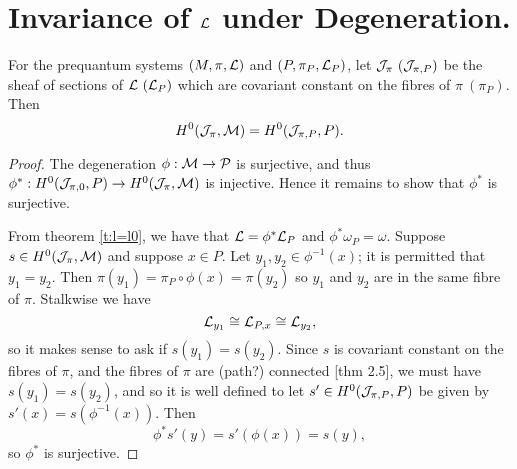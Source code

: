\section{Invariance of $\mathcal{L}$ under Degeneration.}
	\begin{theorem}
		For the prequantum systems $(M,\pi,\mathcal{L})$ and $(P,\pi_{P}, \mathcal{L}_P)$, let $\mathcal{J}_\pi ~(\mathcal{J}_{\pi,P})$ be the sheaf of sections of $\mathcal{L} ~(\mathcal{L}_P)$ which are covariant constant on the fibres of $\pi ~(\pi_P)$. Then
		\begin{equation}
			H^0(\mathcal{J}_\pi, \mathcal{M}) = H^0(\mathcal{J}_{\pi,P}, P).
		\end{equation}
	\end{theorem}
	\begin{proof}
		The degeneration $\phi:\mathcal{M}\to\mathcal{P}$ is surjective, and thus $\phi^\ast:H^0(\mathcal{J}_{\pi,0},P) \to H^0(\mathcal{J}_\pi,\mathcal{M})$ is injective. Hence it remains to show that $\phi^\ast$ is surjective.
		\smallskip
		
		From theorem \ref{t:l=l0}, we have that $\mathcal{L}=\phi^\ast \mathcal{L}_P$ and $\phi^\ast \omega_P = \omega$. Suppose $s\in H^0(\mathcal{J}_{\pi},\mathcal{M})$ and suppose $x \in P$. Let $y_1,y_2 \in \phi^{-1}(x)$; it is permitted that $y_1=y_2$. Then $\pi(y_1) = \pi_P\circ \phi(x) = \pi(y_2)$ so $y_1$ and $y_2$ are in the same fibre of $\pi$. Stalkwise we have
		\begin{equation}
			\mathcal{L}_{y_1} \cong \mathcal{L}_{P,x} \cong \mathcal{L}_{y_2},
		\end{equation} 
		so it makes sense to ask if $s(y_1) = s(y_2)$. Since $s$ is covariant constant on the fibres of $\pi$, and the fibres of $\pi$ are (path?) connected \cite{jeffrey_bohr-sommerfeld_1992}[thm 2.5], we must have $s(y_1)=s(y_2)$, and so it is well defined to let $s'\in H^0(\mathcal{J}_{\pi,P},P)$ be given by $s'(x) = s\left(\phi^{-1}(x)\right)$. Then
		\begin{equation}
			\phi^\ast s'(y) = s'(\phi(x)) = s(y),
		\end{equation}
		so $\phi^\ast$ is surjective.
		\end{proof}
	
		
	